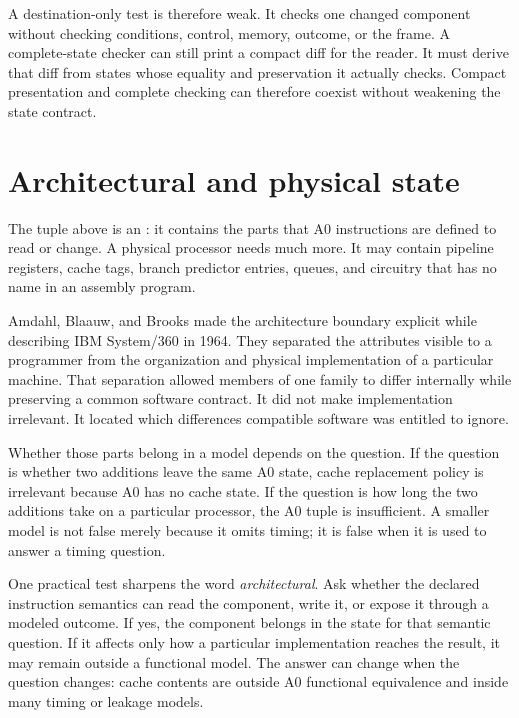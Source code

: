 A destination-only test is therefore weak. It checks one changed component
without checking conditions, control, memory, outcome, or the frame. A
complete-state checker can still print a compact diff for the reader. It must
derive that diff from states whose equality and preservation it actually
checks.
Compact presentation and complete checking can therefore coexist without
weakening the state contract.

\section{Architectural and physical state}

The tuple above is an : it contains the parts
that A0 instructions are defined to read or change. A physical processor
needs much more. It may contain pipeline registers, cache tags, branch
predictor entries, queues, and circuitry that has no name in an assembly
program.

Amdahl, Blaauw, and Brooks made the architecture boundary explicit while
describing IBM System/360 in 1964. They separated the attributes visible to a
programmer from the organization and physical implementation of a particular
machine. That separation allowed members of one family to differ internally
while preserving a common software contract. It did not make implementation
irrelevant. It located which differences compatible software was entitled to
ignore.\autocite{amdahl1964system360}

Whether those parts belong in a model depends on the question. If the question
is whether two additions leave the same A0 state, cache replacement policy is
irrelevant because A0 has no cache state. If the question is how long the two
additions take on a particular processor, the A0 tuple is insufficient. A
smaller model is not false merely because it omits timing; it is false when it
is used to answer a timing question.

One practical test sharpens the word \emph{architectural}. Ask whether the
declared instruction semantics can read the component, write it, or expose it
through a modeled outcome. If yes, the component belongs in the state for that
semantic question. If it affects only how a particular implementation reaches
the result, it may remain outside a functional model. The answer can change
when the question changes: cache contents are outside A0 functional
equivalence and inside many timing or leakage models.

